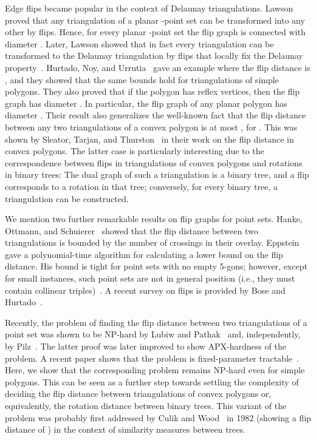 \documentclass[a4paper,11pt]{article}
\begin{document}
Edge flips became popular in the context of Delaunay
triangulations.  Lawson~\cite{lawson_connected} proved that any triangulation
of a planar -point set can be transformed into any other by  flips. 
Hence, for every planar -point set the flip graph 
is connected with diameter .
Later, Lawson showed that in fact every triangulation can be transformed to the Delaunay
triangulation by  flips that locally fix the Delaunay 
property~\cite{lawson_delaunay}. 
Hurtado, Noy, and Urrutia~\cite{hurtado_noy_urrutia} gave an example where the 
flip distance is , 
and they showed that the same bounds hold for triangulations of simple polygons.
They also proved that if the polygon has  reflex vertices, then
the flip graph has diameter . In particular, the flip graph of
any planar polygon has diameter .  Their result also generalizes the
well-known fact that the flip distance between any two triangulations of a
convex polygon is at most , for . This was shown by Sleator, Tarjan, and Thurston~\cite{sleator} in their work on the flip distance in convex polygons.
The latter case is particularly 
interesting due to the correspondence between flips in triangulations of
convex polygons and rotations in binary trees:
The dual graph of such a triangulation is a binary tree, and a flip 
corresponds to a rotation in that tree; conversely, for every 
binary tree, a triangulation can be constructed.

We mention two further remarkable results on 
flip graphs for point sets.  Hanke, Ottmann, and
Schuierer~\cite{edge_flipping_distance} showed that the flip distance between
two triangulations is bounded by the number of crossings in their overlay. 
Eppstein~\cite{eppstein} gave a
polynomial-time algorithm for calculating a lower bound on the flip distance.
His bound is tight for point sets with no empty 5-gons; however, except for
small instances, such point sets are not in general position (i.e.,
they must contain collinear triples)~\cite{empty5gon}. 
A recent survey on flips is provided by Bose and Hurtado~\cite{survey}.

Recently, the problem of finding the flip distance between two triangulations of a
point set was shown to be NP-hard by Lubiw and
Pathak~\cite{lubiw} and, independently, by Pilz~\cite{point_set_hard}.
The latter proof was later improved to show APX-hardness of the problem.
A recent paper shows that the problem is fixed-parameter tractable~\cite{flip_distance_fpt}.
Here, we show that the corresponding problem remains NP-hard even for simple polygons.
This can be seen as a further step towards settling the complexity
of deciding the flip distance between triangulations of convex polygons or, equivalently, the rotation distance between binary trees.
This variant of the problem was probably first addressed by Culik and 
Wood~\cite{tree_similarity} in 1982 (showing a flip distance of ) in the context of similarity measures between trees.
\end{document}

